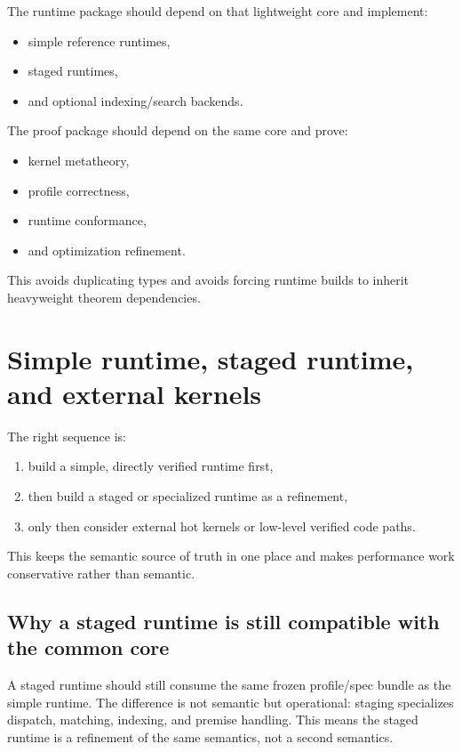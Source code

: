 \documentclass[11pt]{article}
\begin{document}
The runtime package should depend on that lightweight core and implement:
\begin{itemize}
  \item simple reference runtimes,
  \item staged runtimes,
  \item and optional indexing/search backends.
\end{itemize}

The proof package should depend on the same core and prove:
\begin{itemize}
  \item kernel metatheory,
  \item profile correctness,
  \item runtime conformance,
  \item and optimization refinement.
\end{itemize}

This avoids duplicating types and avoids forcing runtime builds to inherit heavyweight theorem dependencies.

\section{Simple runtime, staged runtime, and external kernels}

The right sequence is:
\begin{enumerate}
  \item build a simple, directly verified runtime first,
  \item then build a staged or specialized runtime as a refinement,
  \item only then consider external hot kernels or low-level verified code paths.
\end{enumerate}

This keeps the semantic source of truth in one place and makes performance work conservative rather than semantic.

\subsection{Why a staged runtime is still compatible with the common core}

A staged runtime should still consume the same frozen profile/spec bundle as the simple runtime. The difference is not semantic but operational: staging specializes dispatch, matching, indexing, and premise handling. This means the staged runtime is a refinement of the same semantics, not a second semantics.
\end{document}
